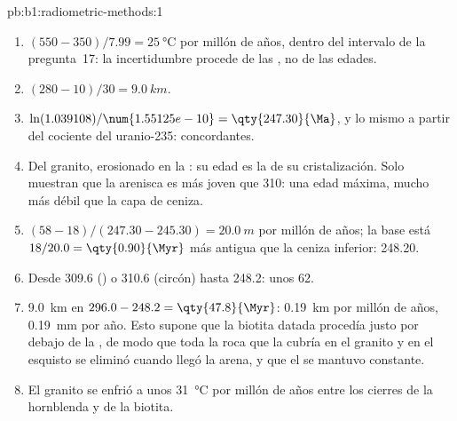 \begin{solution}{pb:b1:radiometric-methods:1}
\begin{enumerate}
  \item $(550 - 350)/7.99 = \qty{25}{\celsius}$ por millón de años, dentro del intervalo
        de la pregunta~17: la incertidumbre procede de las , no de las edades.
  \item $(280 - 10)/30 = \qty{9.0}{km}$.
  \item $\ln(1.039108)/\num{1.55125e-10} = \qty{247.30}{\Ma}$, y lo mismo a partir del
        cociente del uranio-235: concordantes.
  \item Del granito, erosionado en la : su edad es la de su cristalización. Solo muestran que la arenisca es más joven que
        \qty{310}{\Ma}: una edad máxima, mucho más débil que la capa de ceniza.
  \item $(58 - 18)/(247.30 - 245.30) = \qty{20.0}{m}$ por millón de años; la base
        está $18/20.0 = \qty{0.90}{\Myr}$ más antigua que la ceniza inferior:
        \qty{248.20}{\Ma}.
  \item Desde \qty{309.6}{\Ma} () o \qty{310.6}{\Ma} (circón) hasta
        \qty{248.2}{\Ma}: unos \qty{62}{\Myr}.
  \item \qty{9.0}{km} en $296.0 - 248.2 = \qty{47.8}{\Myr}$: \qty{0.19}{km} por
        millón de años, \qty{0.19}{mm} por año. Esto supone que la biotita datada procedía justo por debajo de la , de modo que toda la roca que la cubría en el granito y en el esquisto se eliminó cuando llegó la arena, y que el  se mantuvo constante.
  \item El granito se enfrió a unos \qty{31}{\celsius} por millón de años entre
        los cierres de la hornblenda y de la biotita.
\end{enumerate}
\end{solution}
